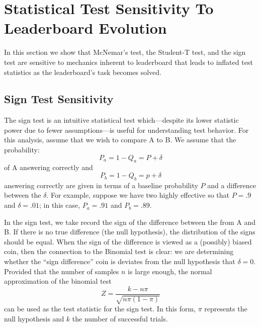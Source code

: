 
\section{Statistical Test Sensitivity To Leaderboard Evolution}

In this section we show that McNemar's test, the Student-T test, and the sign test are sensitive to mechanics inherent to leaderboard that leads to inflated test statistics as the leaderboard's task becomes solved.

\subsection{Sign Test Sensitivity}

The sign test is an intuitive statistical test which---despite its lower statistic power due to fewer assumptions---is useful for understanding test behavior.
For this analysis, assume that we wish to compare \subj{} A to \subj{} B.
We assume that the probability:
%
\begin{equation} \label{eq:pa}
    P_a = 1-Q_a = P+\delta
\end{equation}
\noindent
of A answering correctly and
%
\begin{equation} \label{eq:pb}
    P_b=1-Q_b=p+\delta
\end{equation}
\noindent
answering correctly are given in terms of a baseline probability $P$ and a difference between the \subjs{} $\delta$.
For example, suppose we have two highly effective \subjs{} so that $P=.9$ and $\delta=.01$; in this case, $P_a=.91$ and $P_b=.89$.

In the sign test, we take record the sign of the difference between the \resps{} from A and B.
If there is no true difference (the null hypothesis), the distribution of the signs should be equal.
When the sign of the difference is viewed as a (possibly) biased coin, then the connection to the Binomial test is clear: we are determining whether the ``sign difference'' coin is deviates from the null hypothesis that $\delta=0$.
Provided that the number of samples $n$ is large enough, the normal approximation of the binomial test
\begin{equation}
    Z=\frac{k-n\pi}{\sqrt{n\pi(1-\pi)}}
\end{equation}
can be used as the test statistic for the sign test.
In this form, $\pi$ represents the null hypothesis and $k$ the number of successful trials.

